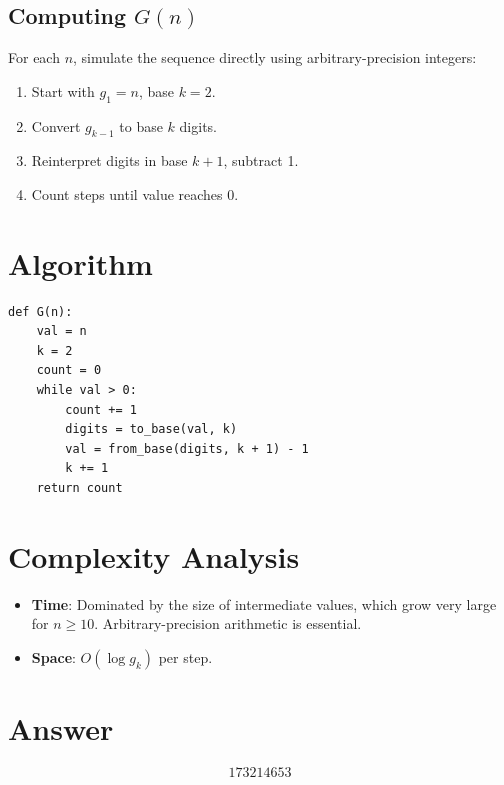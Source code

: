 \documentclass[12pt]{article}
\theoremstyle{definition}
\begin{document}
\subsection{Computing $G(n)$}

For each $n$, simulate the sequence directly using arbitrary-precision integers:

\begin{enumerate}
    \item Start with $g_1 = n$, base $k = 2$.
    \item Convert $g_{k-1}$ to base $k$ digits.
    \item Reinterpret digits in base $k+1$, subtract 1.
    \item Count steps until value reaches 0.
\end{enumerate}

\section{Algorithm}

\begin{verbatim}
def G(n):
    val = n
    k = 2
    count = 0
    while val > 0:
        count += 1
        digits = to_base(val, k)
        val = from_base(digits, k + 1) - 1
        k += 1
    return count
\end{verbatim}

\section{Complexity Analysis}

\begin{itemize}
    \item \textbf{Time}: Dominated by the size of intermediate values, which grow very large for $n \ge 10$. Arbitrary-precision arithmetic is essential.
    \item \textbf{Space}: $O(\log g_k)$ per step.
\end{itemize}

\section{Answer}

\[
\boxed{173214653}
\]
\end{document}
